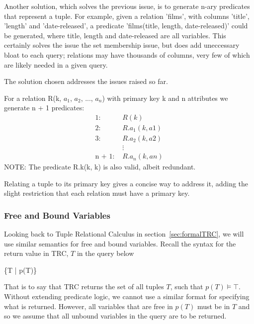 \documentclass[a4paper, 11pt]{article}
\begin{document}
      Another solution, which solves the previous issue, is to generate n-ary
      predicates that represent a tuple. For example, given a relation 'films',
      with columns 'title', 'length' and 'date-released', a predicate
      'films(title, length, date-released)' could be generated, where title,
      length and date-released are all variables. This certainly solves the
      issue the set membership issue, but does add uneccessary bloat to each
      query; relations may have thousands of columns, very few of which are
      likely needed in a given query.

      The solution chosen addresses the issues raised so far.

      For a relation R(k, $a_{1}$, $a_{2}$, ..., $a_{n}$) with primary key k
      and n attributes we generate n + 1 predicates:
      \begin{align*}
        \text{1:  }     & R(k)           \\
        \text{2:  }     & R.a_1(k, a1)   \\
        \text{3:  }     & R.a_2(k, a2)   \\
                        & \vdots         \\
        \text{n + 1:  }  & R.a_n(k, an)
      \end{align*}
      NOTE: The predicate R.k(k, k) is also valid, albeit redundant.

      Relating a tuple to its primary key gives a concise way to address it,
      adding the slight restriction that each relation must have a primary key.

    \subsubsection{Free and Bound Variables}
    \label{sec:freebound}

      Looking back to Tuple Relational Calculus in
      section~\ref{sec:formalTRC}, we will use similar semantics for free and
      bound variables. Recall the syntax for the return value in TRC, $T$ in the
      query below

      \{T | p(T)\}

      That is to say that TRC returns the set of all tuples $T$, such that 
      $p(T) \models \top$. Without extending predicate logic, we cannot use 
      a similar format for specifying what is returned. However, all 
      variables that are free in $p(T)$ must be in $T$ and so we assume 
      that all unbound variables in the query are to be returned.
\end{document}
